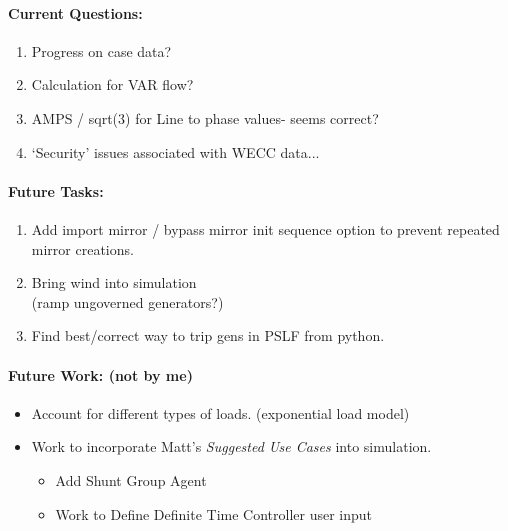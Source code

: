 \documentclass[12pt]{article}
\begin{document}
\begin{multicols}{2}
\begin{enumerate}

	\end{enumerate}

\vfill\null
\columnbreak

	\paragraph{Current Questions:}
	\begin{enumerate}
\itemsep0em 
	\item Progress on case data?
	\item Calculation for VAR flow?
	\item AMPS / sqrt(3) for Line to phase values- seems correct?
	\item `Security' issues associated with WECC data...
	\end{enumerate}
	




\paragraph{Future Tasks:} %
	\begin{enumerate}
		
		\item Add import mirror / bypass mirror init sequence option to prevent repeated mirror creations.

		\item Bring wind into simulation \\ (ramp ungoverned generators?)

		\item Find best/correct way to trip gens in PSLF from python.
		
	\end{enumerate}
\paragraph{Future Work: (not by me)}
\begin{itemize}
\item Account for different types of loads. (exponential load model) %
\item Work to incorporate Matt's \emph{Suggested Use Cases} into simulation.
		\begin{itemize}
		\item Add Shunt Group Agent
		\item Work to Define Definite Time Controller user input
		\end{itemize} 



\end{itemize}
\end{multicols}
\end{document}
